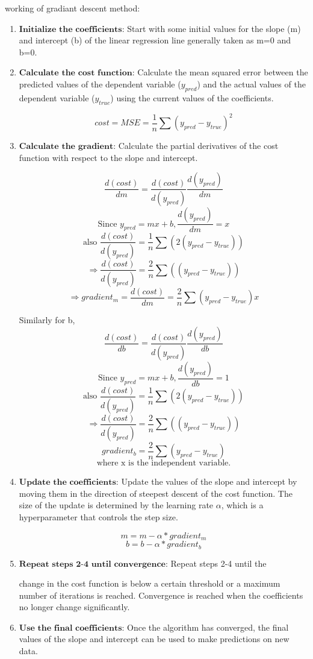 \documentclass{article}
\begin{document}
working of gradiant descent method:
\begin{enumerate}
    \item $\textbf{Initialize the coefficients}$: Start with some initial values for the slope (m) and intercept (b) of the linear regression line generally taken as m=0 and b=0.
    \item  $\textbf{Calculate the cost function}$: Calculate the mean squared error between the predicted values of the dependent variable ($y_{pred}$) and the actual values of the dependent variable ($y_{true}$) using the current values of the coefficients.

          \[cost=MSE=\frac{1}{n} \sum(y_{pred} - y_{true})^2\]
    \item  $\textbf{Calculate the gradient}$: Calculate the partial derivatives of the cost function with respect to the slope and intercept.

          \[\frac{d(cost)}{dm} = \frac{d(cost)}{d(y_{pred})} \frac{d(y_{pred})}{dm}\]
          \[\mbox{Since } y_{pred} = mx + b, \frac{d(y_{pred})}{dm} = x\]
          \[\mbox{also } \frac{d(cost)}{d(y_{pred})} = \frac{1}{n}\sum(2(y_{pred}-y_{true}))\]
          \[\Rightarrow \frac{d(cost)}{d(y_{pred})} = \frac{2}{n}\sum((y_{pred}-y_{true}))\]
          \[\Rightarrow gradient_m = \frac{d(cost)}{dm} = \frac{2}{n}\sum(y_{pred} - y_{true}) x\]

          Similarly for b,
          \[\frac{d(cost)}{db} = \frac{d(cost)}{d(y_{pred})} \frac{d(y_{pred})}{db}\]
          \[\mbox{Since } y_{pred} = mx + b, \frac{d(y_{pred})}{db} = 1\]
          \[\mbox{also } \frac{d(cost)}{d(y_{pred})} = \frac{1}{n}\sum(2(y_{pred}-y_{true}))\]
          \[\Rightarrow \frac{d(cost)}{d(y_{pred})} = \frac{2}{n}\sum((y_{pred}-y_{true}))\]
          \[gradient_b = \frac{2}{n}\sum(y_{pred} - y_{true})\]
          \[\mbox{where x is the independent variable.}\]

    \item $\textbf{Update the coefficients}$: Update the values of the slope and intercept by moving them in the direction of steepest descent of the cost function. The size of the update is determined by the learning rate $\alpha$, which is a hyperparameter that controls the step size.

          \[m = m - \alpha*gradient_m\]
          \[b = b - \alpha * gradient_b\]

    \item $\textbf{Repeat steps 2-4 until convergence}$: Repeat steps 2-4 until the

          change in the cost function is below a certain threshold or a maximum number of iterations is reached. Convergence is reached when the coefficients no longer change significantly.

    \item $\textbf{Use the final coefficients}$: Once the algorithm has converged, the final values of the slope and intercept can be used to make predictions on new data.
\end{enumerate}
\end{document}

